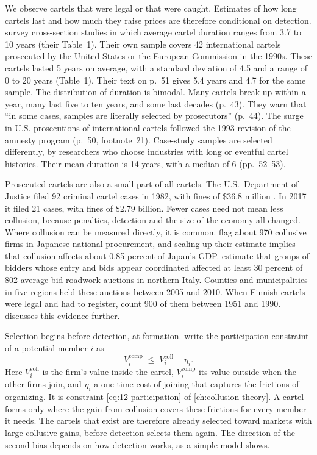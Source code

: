 We observe cartels that were legal or that were caught. Estimates of how long cartels last and how much they raise
prices are therefore conditional on detection. \citet{LevensteinSuslow2006} survey cross-section studies in which
average cartel duration ranges from 3.7 to 10 years (their Table~1). Their own sample covers 42 international
cartels prosecuted by the United States or the European Commission in the 1990s. These cartels lasted 5 years on
average, with a standard deviation of 4.5 and a range of 0 to 20 years (Table~1). Their text on p.~51 gives 5.4 years
and 4.7 for the same sample. The distribution of duration is bimodal. Many
cartels break up within a year, many last five to ten years, and some last decades (p.~43). They warn that ``in some
cases, samples are literally selected by prosecutors'' (p.~44). The surge in U.S. prosecutions of international
cartels followed the 1993 revision of the amnesty program (p.~50, footnote~21). Case-study samples
are selected differently, by researchers who choose industries with long or eventful cartel histories. Their mean
duration is 14 years, with a median of 6 (pp.~52--53).

Prosecuted cartels are also a small part of all cartels. The U.S.\ Department of Justice filed 92 criminal
cartel cases in 1982, with fines of \$36.8 million \citep[p.~182]{AskerNocke2021}. In 2017 it filed 21 cases, with
fines of \$2.79 billion. Fewer cases need not mean less collusion, because penalties, detection and the
size of the economy all changed. Where collusion can be measured directly, it is common.
\citet{KawaiNakabayashi2020} flag about 970 collusive firms in Japanese national procurement, and scaling up their
estimate implies that collusion affects about 0.85 percent of Japan's GDP. \citet[pp.~4, 6 and~29--30]{ConleyDecarolis2016}
estimate that groups of bidders whose entry and bids appear coordinated affected at least 30 percent of 802
average-bid roadwork auctions in northern Italy. Counties and municipalities in five regions held these auctions
between 2005 and 2010. When
Finnish cartels were legal and had to register, \citet{HyytinenSteenToivanen2018} count 900 of them between 1951
and 1990.  discusses this evidence further.

Selection begins before detection, at formation. \citet[p.~187]{AskerNocke2021} write the participation
constraint of a potential member $i$ as
\begin{equation}\label{eq:13-participation}
  V_i^{\mathrm{comp}} \;\le\; V_i^{\mathrm{coll}} - \eta_i .
\end{equation}
Here $V_i^{\mathrm{coll}}$ is the firm's value inside the cartel, $V_i^{\mathrm{comp}}$ its value outside when the
other firms join, and $\eta_i$ a one-time cost of joining that captures the frictions of organizing. It is
constraint \eqref{eq:12-participation} of \cref{ch:collusion-theory}. A cartel forms only where the gain from collusion covers
these frictions for every member it needs. The cartels that exist are therefore already selected toward markets
with large collusive gains, before detection selects them again. The direction of the second bias depends on how
detection works, as a simple model shows.

